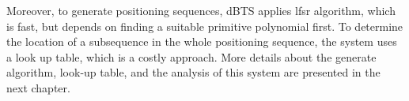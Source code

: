 Moreover, to generate positioning sequences, \gls{dBTS} applies \gls{lfsr} algorithm, which is fast, but depends on finding a suitable primitive polynomial first. To determine the location of a subsequence in the whole positioning sequence, the system uses a look up table, which is a costly approach. More details about the generate algorithm, look-up table, and the analysis of this system are presented in the next chapter. 








